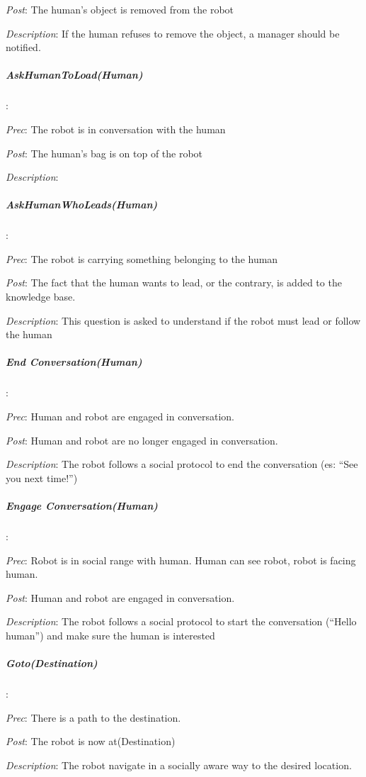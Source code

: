 \textit{Post}: The human's object is removed from the robot

\textit{Description}: If the human refuses to remove the object, a
manager should be notified.


\subparagraph{AskHumanToLoad(Human)}

:

\textit{Prec}: The robot is in conversation with the human

\textit{Post}: The human's bag is on top of the robot

\textit{Description}:


\subparagraph{AskHumanWhoLeads(Human)}

:

\textit{Prec}: The robot is carrying something belonging to the human

\textit{Post}: The fact that the human wants to lead, or the contrary,
is added to the knowledge base.

\textit{Description}: This question is asked to understand if the
robot must lead or follow the human

 


\subparagraph{End Conversation(Human)}

:

\textit{Prec}: Human and robot are engaged in conversation.

\textit{Post}: Human and robot are no longer engaged in conversation.

\textit{Description}: The robot follows a social protocol to end the
conversation (es: ``See you next time!'')


\subparagraph{Engage Conversation(Human)}

:

\textit{Prec}: Robot is in social range with human. Human can see
robot, robot is facing human.

\textit{Post}: Human and robot are engaged in conversation.

\textit{Description}: The robot follows a social protocol to start
the conversation (``Hello human'') and make sure the human is interested


\subparagraph{Goto(Destination)}

:

\textit{Prec}: There is a path to the destination.

\textit{Post}: The robot is now at(Destination)

\textit{Description}: The robot navigate in a socially aware way to
the desired location.

